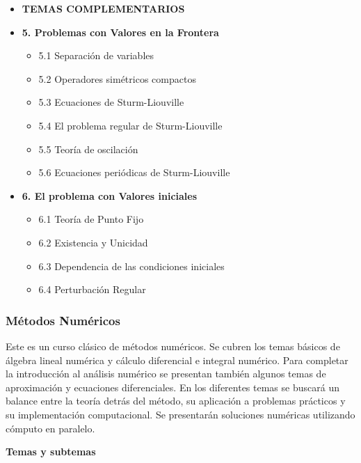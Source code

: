 \documentclass[10pt,a4paper]{article}
\begin{document}
\begin{itemize}
    \item \textbf{TEMAS COMPLEMENTARIOS}

    \item \textbf{5. Problemas con Valores en la Frontera}
    \begin{itemize}
        \item 5.1 Separación de variables
        \item 5.2 Operadores simétricos compactos
        \item 5.3 Ecuaciones de Sturm-Liouville
        \item 5.4 El problema regular de Sturm-Liouville
        \item 5.5 Teoría de oscilación
        \item 5.6 Ecuaciones periódicas de Sturm-Liouville
    \end{itemize}

    \item \textbf{6. El problema con Valores iniciales}
    \begin{itemize}
        \item 6.1 Teoría de Punto Fijo
        \item 6.2 Existencia y Unicidad
        \item 6.3 Dependencia de las condiciones iniciales
        \item 6.4 Perturbación Regular
    \end{itemize}
\end{itemize}

\newpage

\subsubsection{Métodos Numéricos}

Este es un curso clásico de métodos numéricos. Se cubren los temas básicos de álgebra lineal numérica y cálculo diferencial e integral numérico. Para completar la introducción al análisis numérico se presentan también algunos temas de aproximación y ecuaciones diferenciales. En los diferentes temas se buscará un balance entre la teoría detrás del método, su aplicación a problemas prácticos y su implementación computacional. Se presentarán soluciones numéricas utilizando cómputo en paralelo.

\textbf{Temas y subtemas}
\end{document}
